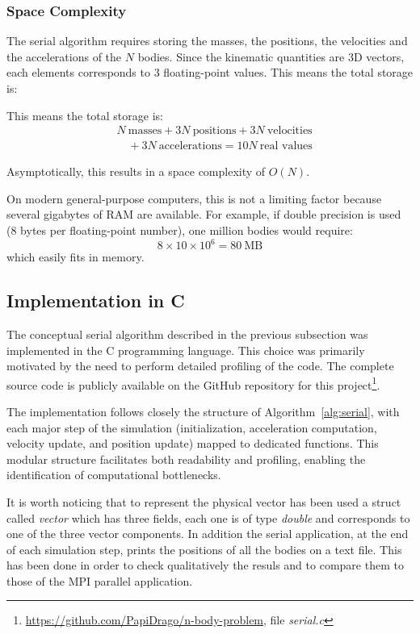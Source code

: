 \documentclass{article}
\begin{document}
\subsubsection{Space Complexity}
The serial algorithm requires storing the masses, the positions, the velocities and the accelerations of the $N$ bodies. Since the kinematic quantities are 3D vectors, each elements corresponds to 3 floating-point values.
This means the total storage is:

This means the total storage is: %
\begin{align*}
&N \ \text{masses} + 3N \ \text{positions} + 3N \ \text{velocities} \\
&\quad + 3N \ \text{accelerations} = 10N \ \text{real values}
\end{align*}

Asymptotically, this results in a space complexity of $O(N)$.  

On modern general-purpose computers, this is not a limiting factor because several gigabytes of RAM are available. For example, if double precision is used (8 bytes per floating-point number), one million bodies would require:
\[
8 \times 10 \times 10^6 = 80 \ \text{MB}
\]
which easily fits in memory.

\subsection{Implementation in C}
\label{subsec:c_impl}
The conceptual serial algorithm described in the previous subsection was implemented in the C programming language. This choice was primarily motivated by the need to perform detailed profiling of the code. The complete source code is publicly available on the GitHub repository for this project\footnote{\url{https://github.com/PapiDrago/n-body-problem}\label{fn:repo}, file \emph{serial.c}}.

The implementation follows closely the structure of Algorithm~\ref{alg:serial}, with each major step of the simulation (initialization, acceleration computation, velocity update, and position update) mapped to dedicated functions.
This modular structure facilitates both readability and profiling, enabling the identification of computational bottlenecks.  

It is worth noticing that to represent the physical vector has been used a struct called \emph{vector} which has three fields, each one is of type \emph{double} and corresponds to one of the three vector components.
In addition the serial application, at the end of each simulation step, prints the positions of all the bodies on a text file. This has been done in order to check qualitatively the resuls and to compare them to those of the MPI parallel application.
\end{document}
